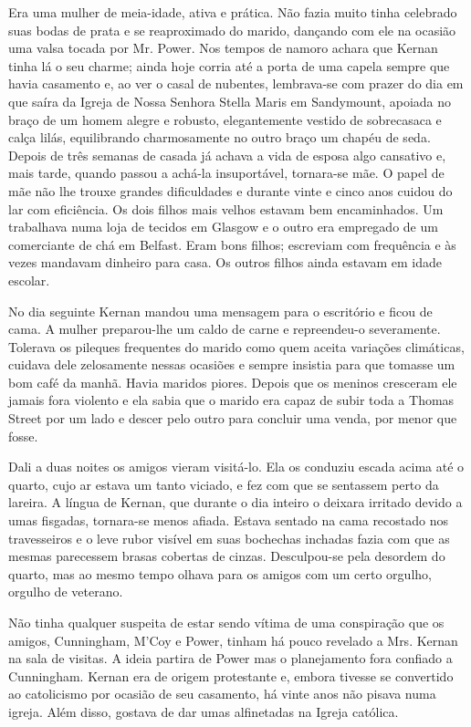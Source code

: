 Era uma mulher de meia-idade, ativa e prática. Não fazia muito tinha
celebrado suas bodas de prata e se reaproximado do marido, dançando
com ele na ocasião uma valsa tocada por Mr. Power. Nos tempos de
namoro achara que Kernan tinha lá o seu charme; ainda hoje corria
até a porta de uma capela sempre que havia casamento e, ao ver o casal
de nubentes, lembrava-se com prazer do dia em que saíra da Igreja de
Nossa Senhora Stella Maris em Sandymount, apoiada no braço de um homem
alegre e robusto, elegantemente vestido de sobrecasaca e calça
lilás, equilibrando charmosamente no outro braço um chapéu de seda.
Depois de
três semanas de casada já achava a vida de esposa algo cansativo e,
mais tarde, quando passou a achá-la insuportável, tornara-se mãe. O
papel de mãe não lhe trouxe grandes dificuldades e durante vinte e
cinco anos cuidou do lar com eficiência. Os dois filhos mais velhos
estavam bem encaminhados. Um trabalhava numa loja de tecidos em
Glasgow e o outro era empregado de um comerciante de chá em Belfast.
Eram bons filhos; escreviam com frequência e às vezes mandavam
dinheiro para casa. Os outros filhos ainda estavam em idade escolar.

No dia seguinte Kernan mandou uma mensagem para o escritório e ficou
de cama. A mulher preparou-lhe um caldo de carne e repreendeu-o
severamente. Tolerava os pileques frequentes do marido como quem
aceita variações climáticas, cuidava dele zelosamente nessas
ocasiões e sempre insistia para que tomasse um bom café da manhã.
Havia maridos piores. Depois que os meninos cresceram ele jamais fora
violento e ela sabia que o marido era capaz de subir toda a Thomas
Street por um lado e descer pelo outro para concluir uma venda, por
menor que fosse.

Dali a duas noites os amigos vieram visitá-lo. Ela os conduziu escada
acima até o quarto, cujo ar estava um tanto viciado, e fez com que se
sentassem perto da lareira. A língua de Kernan, que durante o dia
inteiro o deixara irritado devido a umas fisgadas, tornara-se menos
afiada. Estava sentado na cama recostado nos travesseiros e o leve
rubor visível em suas bochechas inchadas fazia com que as mesmas
parecessem brasas cobertas de cinzas. Desculpou-se pela desordem do
quarto, mas ao mesmo tempo olhava para os amigos com um certo orgulho,
orgulho de veterano.

Não tinha qualquer suspeita de estar sendo vítima de uma conspiração
que os amigos, Cunningham, M'Coy e Power, tinham há pouco revelado a
Mrs. Kernan na sala de visitas. A ideia partira de Power mas o
planejamento fora confiado a Cunningham. Kernan era de origem
protestante e, embora tivesse se convertido ao catolicismo por ocasião
de seu casamento, há vinte anos não pisava numa igreja. Além disso,
gostava de dar umas alfinetadas na Igreja católica.


